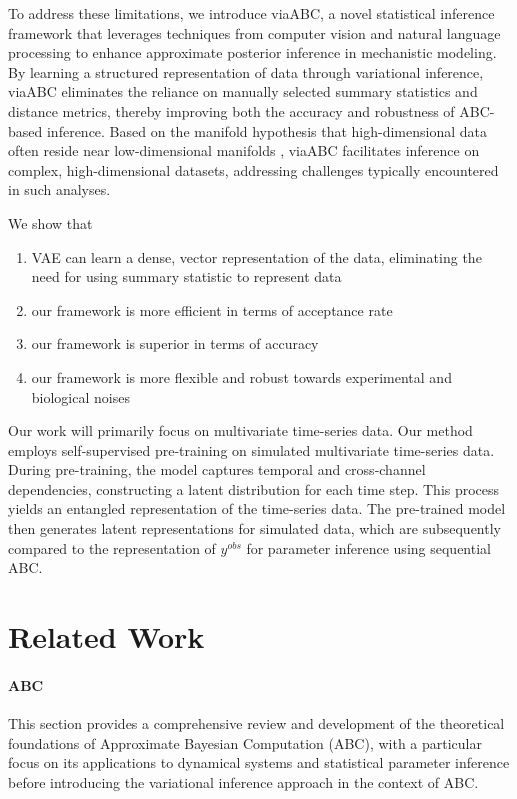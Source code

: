 \documentclass[12pt]{article} %
\newcommand{\para}[1]{\vspace*{-4.5mm}\paragraph{#1}}
\begin{document}
To address these limitations, we introduce viaABC, a novel statistical inference framework that leverages techniques from computer vision and natural language processing to enhance approximate posterior inference in mechanistic modeling. By learning a structured representation of data through variational inference, viaABC eliminates the reliance on manually selected summary statistics and distance metrics, thereby improving both the accuracy and robustness of ABC-based inference. Based on the manifold hypothesis that high-dimensional data often reside near low-dimensional manifolds \citep{fefferman2016testing}, viaABC facilitates inference on complex, high-dimensional datasets, addressing challenges typically encountered in such analyses. 


We show that
\begin{enumerate}
\item VAE can learn a dense, vector representation of the data, eliminating the need for using summary statistic to represent data
\item our framework is more efficient in terms of acceptance rate
\item our framework is superior in terms of accuracy
\item our framework is more flexible and robust towards experimental and biological noises
\end{enumerate}

Our work will primarily focus on multivariate time-series data. Our method employs self-supervised pre-training on simulated multivariate time-series data. During pre-training, the model captures temporal and cross-channel dependencies, constructing a latent distribution for each time step. This process yields an entangled representation of the time-series data. The pre-trained model then generates latent representations for simulated data, which are subsequently compared to the representation of $y^{obs}$ for parameter inference using sequential ABC.

\section*{Related Work}

\para{ABC}
This section provides a comprehensive review and development of the theoretical foundations of Approximate Bayesian Computation (ABC), with a particular focus on its applications to dynamical systems and statistical parameter inference before introducing the variational inference approach in the context of ABC. 
\end{document}
